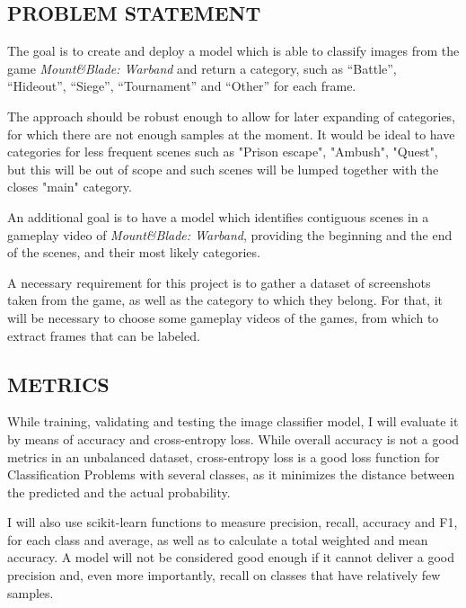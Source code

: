 \documentclass[
]{article}
\begin{document}
\newpage


\hypertarget{problem-statement}{%
\subsection{PROBLEM STATEMENT}\label{problem-statement}}

The goal is to create and deploy a model which is able to classify
images from the game \emph{Mount\&Blade: Warband} and return a category,
such as ``Battle'', ``Hideout'', ``Siege'', ``Tournament'' and
``Other'' for each frame.

The approach should be robust enough to allow for later expanding of categories, for which there are not enough samples at the moment.
It would be ideal to have categories for less frequent scenes such as "Prison escape", "Ambush", "Quest", but this will be out of scope and such scenes will be lumped together with the closes "main" category.

An additional goal is to have a model which identifies contiguous scenes in a gameplay video of \emph{Mount\&Blade: Warband}, providing the beginning and the end of the scenes, and their most likely categories.

A necessary requirement for this project is to gather a dataset of screenshots taken from the game, as well as the category to which they belong. For that, it will be necessary to choose some gameplay videos of the games, from which to extract frames that can be labeled.

\hypertarget{metrics}{%
\subsection{METRICS}\label{metrics}}

While training, validating and testing the image classifier model, I will evaluate it  by means of accuracy and cross-entropy loss.
While overall accuracy is not a good metrics in an unbalanced dataset, cross-entropy loss is a good loss function for Classification Problems with several classes, as it minimizes the distance between the predicted and the actual probability.

I will also use scikit-learn functions to measure precision, recall, accuracy and F1, for each class and average, as well as to calculate a total weighted and mean accuracy. A model will not be considered good enough if it cannot deliver a good precision and, even more importantly, recall on classes that have relatively few samples.
\end{document}
